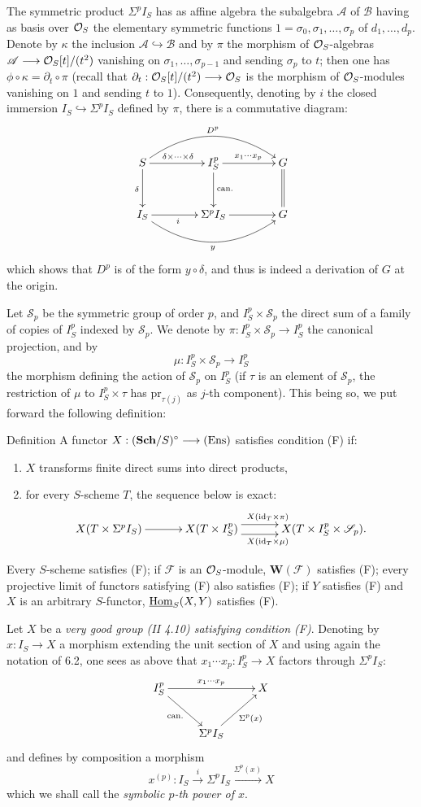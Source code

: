 The symmetric product $\Sigma^p I_S$ has as affine algebra the subalgebra $\mathscr A$ of $\mathscr B$ having as basis over $\mathcal{O}_S$ the elementary symmetric functions $1=\sigma_0,\sigma_1,\ldots,\sigma_p$ of $d_1,\ldots,d_p$. Denote by $\kappa$ the inclusion $\mathscr A\hookrightarrow\mathscr B$ and by $\pi$ the morphism of $\mathcal{O}_S$-algebras $\mathscr A\longrightarrow\mathcal{O}_S[t]/(t^2)$ vanishing on $\sigma_1,\ldots,\sigma_{p-1}$ and sending $\sigma_p$ to $t$; then one has $\phi\circ\kappa=\partial_t\circ\pi$ (recall that $\partial_t:\mathcal{O}_S[t]/(t^2)\longrightarrow\mathcal{O}_S$ is the morphism of $\mathcal{O}_S$-modules vanishing on $1$ and sending $t$ to $1$). Consequently, denoting by $i$ the closed immersion $I_S\hookrightarrow\Sigma^p I_S$ defined by $\pi$, there is a commutative diagram:
\[
\xymatrix@C=4em@R=3em{S\ar[r]^{\delta\times\cdots\times\delta}\ar@/^2pc/[rr]^{D^p}\ar[d]_\delta&I_S^p\ar[r]^{x_1\cdots x_p}\ar[d]^{\mathrm{can.}}&G\ar@{=}[d]\\
I_S\ar[r]_i\ar@/_2pc/[rr]_y&\Sigma^p I_S\ar[r]&G}
\]
which shows that $D^p$ is of the form $y\circ\delta$, and thus is indeed a derivation of $G$ at the origin.

Let $\mathscr S_p$ be the symmetric group of order $p$, and $I_S^p\times\mathscr S_p$ the direct sum of a family of copies of $I_S^p$ indexed by $\mathscr S_p$. We denote by $\pi:I_S^p\times\mathscr S_p\to I_S^p$ the canonical projection, and by
\[
\mu:I_S^p\times\mathscr S_p\longrightarrow I_S^p
\]
the morphism defining the action of $\mathscr S_p$ on $I_S^p$ (\ie if $\tau$ is an element of $\mathscr S_p$, the restriction of $\mu$ to $I_S^p\times\tau$ has $\mathrm{pr}_{\tau(j)}$ as $j$-th component). This being so, we put forward the following definition:
\begin{enoncerm}{Definition}{}
A functor $X:(\mathbf{Sch}/S)^\circ\longrightarrow\textup{(Ens)}$ satisfies condition (F) if:
\begin{enumerate}[label=\alph*)]
\item $X$ transforms finite direct sums into direct products,
\item for every $S$-scheme $T$, the sequence below is exact:
\[
\xymatrix@C=3.2em{X(T\times\Sigma^p I_S)\ar[r]&X(T\times I_S^p)\ar@<1ex>[r]^{X(\mathrm{id}_T\times\pi)}\ar@<-1ex>[r]_{X(\mathrm{id}_T\times\mu)}&X(T\times I_S^p\times\mathscr S_p).}
\]
\end{enumerate}
\end{enoncerm}
Every $S$-scheme satisfies (F); if $\mathscr F$ is an $\mathcal{O}_S$-module, $\mathbf W(\mathscr F)$ satisfies (F); every projective limit of functors satisfying (F) also satisfies (F); if $Y$ satisfies (F) and $X$ is an arbitrary $S$-functor, $\underline{\operatorname{Hom}}_S(X,Y)$ satisfies (F).

Let $X$ be a \emph{very good group (II 4.10) satisfying condition (F)}. Denoting by $x:I_S\to X$ a morphism extending the unit section of $X$ and using again the notation of 6.2, one sees as above that $x_1\cdots x_p:I_S^p\to X$ factors through $\Sigma^p I_S$:
\[
\xymatrix{I_S^p\ar[rr]^{x_1\cdots x_p}\ar[dr]_{\mathrm{can.}}&&X\\&\Sigma^p I_S\ar[ur]_{\Sigma^p(x)}&}
\]
and defines by composition a morphism
\[
x^{(p)}:I_S\xrightarrow{i}\Sigma^p I_S\xrightarrow{\Sigma^p(x)}X
\]
which we shall call the \emph{symbolic $p$-th power of $x$}.
